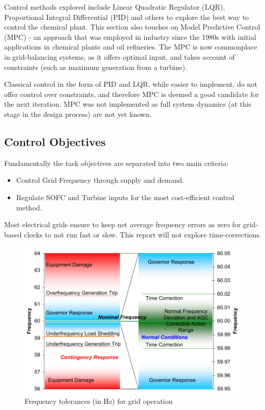 Control methods explored include Linear Quadratic Regulator (LQR), Proportional Integral Differential (PID) and others to explore the best way to control the chemical plant. This section also touches on Model Predictive Control (MPC) - an approach that was employed in industry since the 1980s with initial applications in chemical plants and oil refineries.
The MPC is now commonplace in grid-balancing systems, as it offers optimal input, and takes account of constraints (such as maximum generation from a turbine). \cite{power:mpcadvs}

Classical control in the form of PID and LQR, while easier to implement, do not offer control over constraints, and therefore MPC is deemed a good candidate for the next iteration.
MPC was not implemented as full system dynamics (at this stage in the design process) are not yet known.

\subsection{Control Objectives}

Fundamentally the task objectives are separated into two main criteria:
\begin{itemize}
\itemsep0em 
\item{Control Grid Frequency through supply and demand.}
\item{Regulate SOFC and Turbine inputs for the most cost-efficient control method.}
\end{itemize}
Most electrical grids ensure to keep net average frequency errors as zero for grid-based clocks to not run fast or slow. This report will not explore time-corrections. \cite{power:timecorrection}

\begin{figure}[htb]
\centering
        \includegraphics[scale=0.7]{images/freq.pdf}
\caption{Frequency tolerances (in Hz) for grid operation \cite{power:freqs}}
\label{fig:freqgrid}
\end{figure}
